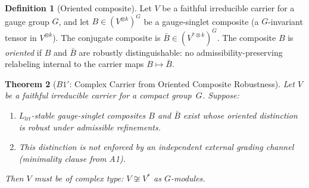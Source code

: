 \documentclass[11pt,a4paper]{article}
\newtheorem{theorem}{Theorem}[section]
\theoremstyle{definition}
\newtheorem{definition}[theorem]{Definition}
\begin{document}
\begin{definition}[Oriented composite]\label{def:oriented_composite}
Let $V$ be a faithful irreducible carrier for a gauge group $G$, and
let $B \in (V^{\otimes k})^G$ be a gauge-singlet composite
(a $G$-invariant tensor in $V^{\otimes k}$).  The conjugate composite
is $\bar{B} \in (V^{*\otimes k})^G$.  The composite $B$ is
\emph{oriented} if $B$ and $\bar{B}$ are robustly distinguishable:
no admissibility-preserving relabeling internal to the carrier maps
$B \mapsto \bar{B}$.
\end{definition}

\begin{theorem}[$B1'$: Complex Carrier from Oriented Composite Robustness]\label{thm:B1prime}
Let $V$ be a faithful irreducible carrier for a compact group~$G$.
Suppose:
\begin{enumerate}[label=(B\arabic*),nosep]
  \item $L_{\mathrm{irr}}$-stable gauge-singlet composites $B$ and
        $\bar{B}$ exist whose oriented distinction is robust under
        admissible refinements.
  \item This distinction is not enforced by an independent external
        grading channel (minimality clause from A1).
\end{enumerate}
Then $V$ must be of \emph{complex type}: $V \not\cong V^*$ as $G$-modules.
\end{theorem}
\end{document}
